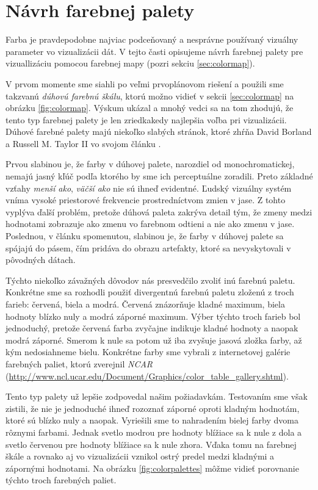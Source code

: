 \section{Návrh farebnej palety}
Farba je pravdepodobne najviac podceňovaný a nesprávne používaný vizuálny parameter vo vizualizácii dát. V tejto časti opisujeme návrh farebnej palety pre vizuallizáciu pomocou farebnej mapy (pozri sekciu \ref{sec:colormap}).

V prvom momente sme siahli po veľmi prvoplánovom riešení a použili sme takzvanú \textit{dúhovú farebnú škálu}, ktorú možno vidieť v sekcii \ref{sec:colormap} na obrázku \ref{fig:colormap}. Výskum ukázal a mnohý vedci sa na tom zhodujú, že tento typ farebnej palety je len zriedkakedy najlepšia voľba pri vizualizácii. Dúhové farebné palety majú niekoľko slabých stránok, ktoré zhŕňa David Borland a Russell M. Taylor II vo svojom článku \cite{RainbowHarmful}.

Prvou slabinou je, že farby v dúhovej palete, narozdiel od monochromatickej, nemajú jasný kľúč podľa ktorého by sme ich perceptuálne zoradili. Preto základné vzťahy \textit{menší ako}, \textit{väčší ako} nie sú ihneď evidentné. Ľudský vizuálny systém vníma vysoké priestorové frekvencie prostredníctvom zmien v jase. Z tohto vyplýva ďalší problém, pretože dúhová paleta zakrýva detail tým, že zmeny medzi hodnotami zobrazuje ako zmenu vo farebnom odtieni a nie ako zmenu v jase. Poslednou, v článku spomenutou, slabinou je, že farby v dúhovej palete sa spájajú do pásem, čím pridáva do obrazu artefakty, ktoré sa nevyskytovali v pôvodných dátach. 

Týchto niekoľko závažných dôvodov nás presvedčilo zvoliť inú farebnú paletu. Konkrétne sme sa rozhodli použiť divergentnú farebnú paletu zloženú z troch farieb: červená, biela a modrá. Červená znázorňuje kladné maximum, biela hodnoty blízko nuly a modrá záporné maximum. Výber týchto troch farieb bol jednoduchý, pretože červená farba zvyčajne indikuje kladné hodnoty a naopak modrá záporné. Smerom k nule sa potom už iba zvyšuje jasová zložka farby, až kým nedosiahneme bielu. Konkrétne farby sme vybrali z internetovej galérie farebných paliet, ktorú zverejnil \textit{NCAR} (\url{http://www.ncl.ucar.edu/Document/Graphics/color_table_gallery.shtml}).

Tento typ palety už lepšie zodpovedal našim požiadavkám. Testovaním sme však zistili, že nie je jednoduché ihneď rozoznať záporné oproti kladným hodnotám, ktoré sú blízko nuly a naopak. Vyriešili sme to nahradením bielej farby dvoma rôznymi farbami. Jednak svetlo modrou pre hodnoty blížiace sa k nule z dola a svetlo červenou pre hodnoty blížiace sa k nule zhora. Vďaka tomu na farebnej škále a rovnako aj vo vizualizácii vznikol ostrý predel medzi kladnými a zápornými hodnotami. Na obrázku \ref{fig:colorpalettes} môžme vidieť porovnanie týchto troch farebných paliet.


